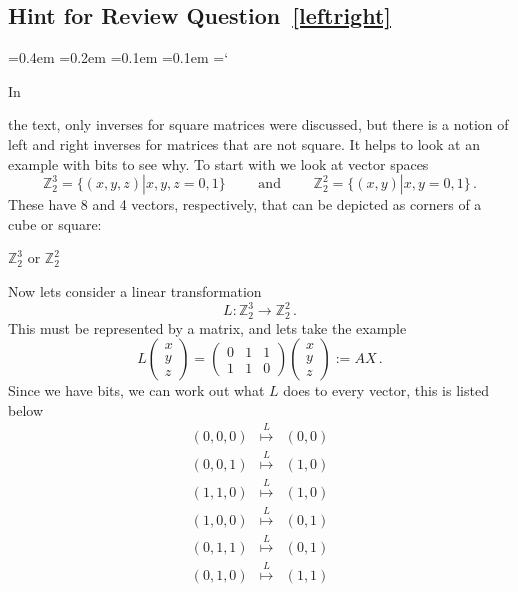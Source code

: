 
\subsection*{Hint for Review Question~\ref{leftright}}

{\ttfamily
{}\font=0.4em
\font=0.2em
\font=0.1em
\font=0.1em
\hyphenchar\font=`\-


\hypertarget{inverse_matrix_hint}{In} 
the text, only inverses for square matrices were discussed, but there is a notion of left and right inverses for matrices that are not square.
It helps to look at an example with bits to see why.
To start with we look at vector spaces
$${\mathbb Z}_2^3=\{(x,y,z)|x,y,z=0,1\}\qquad \mbox{ and } \qquad {\mathbb Z}_2^2=\{(x,y)|x,y=0,1\}\, .$$
These have 8 and 4 vectors, respectively, that can be depicted as corners of a cube or square:
\begin{center}
${\mathbb Z}_2^3$ \hspace{4mm} or ${\mathbb Z}_2^2$
\end{center}
Now lets consider a linear transformation
$$
L:{\mathbb Z}_2^3\longrightarrow{\mathbb Z}_2^2\, .
$$
This must be represented by a matrix, and lets take the example
$$
L\begin{pmatrix}x\\y\\z\end{pmatrix}=\begin{pmatrix}0 & 1 & 1\\1 & 1 &0\end{pmatrix}\begin{pmatrix}x\\y\\z\end{pmatrix}:=A X\, .
$$
Since we have bits, we can work out what $L$ does to every vector, this is listed below
$$
\begin{array}{ccc}
(0,0,0)&\stackrel{L}\mapsto&(0,0)\\[2mm]
(0,0,1)&\stackrel{L}\mapsto&(1,0)\\
(1,1,0)&\stackrel{L}\mapsto&(1,0)\\[2mm]
(1,0,0)&\stackrel{L}\mapsto&(0,1)\\
(0,1,1)&\stackrel{L}\mapsto&(0,1)\\[2mm]
(0,1,0)&\stackrel{L}\mapsto&(1,1)\\

\end{array}$$}

